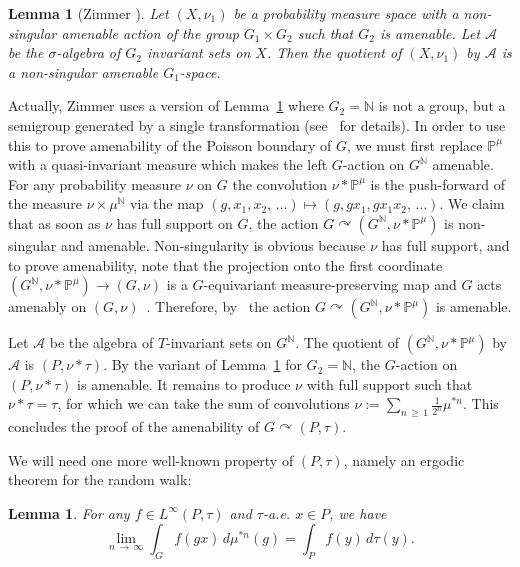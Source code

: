 \documentclass[10pt]{amsart}
\newtheorem{lemm}[theo]{Lemma}\newtheorem{prop}[theo]{Proposition}\newtheorem{coro}[theo]{Corollary}\newtheorem{conj}[theo]{Conjecture}
\theoremstyle{definition}\newtheorem{defi}[theo]{Definition}\newtheorem{rema}[theo]{Remark}\newtheorem{exam}[theo]{Example}\newtheorem{exem}[theo]{Example}\newtheorem{nota}[theo]{Notation}
\newcommand{\bbN}{\mathbb{N}}
\newcommand{\bbP}{\mathbb{P}}
\newcommand{\calA}{\mathcal{A}}
\begin{document}
\begin{lemm}[Zimmer {\cite[Theorem~3.3]{Zimmer78}}]\label{lem:QuotientAm}
Let $(X,\nu_1)$ be a probability measure space with a non-singular amenable action of the group $G_1\times G_2$ such that $G_2$ is amenable. Let $\calA$ be the $\sigma$-algebra of $G_2$ invariant sets on $X$. Then the quotient of $(X,\nu_1)$ by $\calA$ is a non-singular amenable $G_1$-space.
\end{lemm}

Actually, Zimmer uses a version of Lemma~\ref{lem:QuotientAm} where $G_2=\bbN$ is not a group, but a semigroup generated by a single transformation (see~\cite[Section~5]{Zimmer78} for details). In order to use this to prove amenability of the Poisson boundary of $G$, we must first replace $\bbP^\mu$ with a quasi-invariant measure which makes the left $G$-action on $G^\bbN$ amenable. For any probability measure $\nu$ on $G$ the convolution $\nu*\bbP^\mu$ is the push-forward of the measure $\nu\times \mu^\bbN$ via the map $(g,x_1,x_2,\,\ldots)\mapsto (g,gx_1,gx_1x_2,\,\ldots).$ We claim that as soon as $\nu$ has full support on $G$, the action $G\curvearrowright (G^\bbN,\nu*\bbP^\mu)$ is non-singular and amenable. Non-singularity is obvious because $\nu$ has full support, and to prove amenability, note that the projection onto the first coordinate $(G^\bbN,\nu*\bbP^\mu)\to (G,\nu)$ is a $G$-equivariant measure-preserving map and $G$ acts amenably on $(G,\nu)$~\cite[4.3.2]{Zimmer}. Therefore, by~\cite[Theorem~2.4]{Zimmer78} the action $G\curvearrowright (G^\bbN, \nu*\bbP^\mu)$ is amenable.

Let $\calA$ be the algebra of $T$-invariant sets on $G^\bbN$. The quotient of $(G^\bbN,\nu*\bbP^\mu)$ by $\calA$ is $(P,\nu*\tau)$. By the variant of Lemma~\ref{lem:QuotientAm} for $G_2=\bbN$, the $G$-action on $(P,\nu*\tau)$ is amenable. It remains to produce $\nu$ with full support such that $\nu*\tau=\tau$, for which we can take the sum of convolutions $\nu:=\sum_{n\,\geq\,1} \frac{1}{2^n} \mu^{\ast n}$. This concludes the proof of the amenability of $G\curvearrowright(P,\tau)$.

We will need one more well-known property of $(P,\tau)$, namely an ergodic theorem for the random walk:

\begin{lemm}\label{lem:ConvConv}
For any $f\in L^\infty(P,\tau)$ and $\tau$-a.e. $x\in P$, we have 
\[
\lim_{n\,\to\,\infty} \int_G f(gx)\, d\mu^{\ast n}(g)=\int_P f(y) \, d\tau(y).
\]
\end{lemm}
\end{document}
